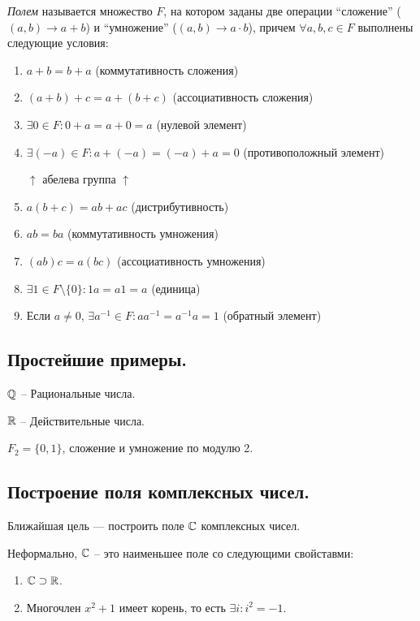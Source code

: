 \begin{definition}
    \textit{Полем} называется множество $F$, на котором заданы две операции ``сложение'' ($(a, b) \to a + b$) и ``умножение'' ($(a, b) \to a \cdot b$), причем $\forall a, b, c \in F$ выполнены следующие условия:

    \begin{enumerate}[nosep]
        \item $a + b = b + a$ (коммутативность сложения)
        \item $(a + b) + c = a + (b + c)$ (ассоциативность сложения)
        \item $\exists 0 \in F : 0 + a = a + 0 = a$ (нулевой элемент)
        \item $\exists (-a) \in F: a+(-a)=(-a)+a=0$ (противоположный элемент)

            $\uparrow$ абелева группа $\uparrow$
        \item $a(b+c) = ab + ac$ (дистрибутивность)
        \item $ab=ba$ (коммутативность умножения)
        \item $(ab)c=a(bc)$ (ассоциативность умножения)
        \item $\exists 1 \in F \setminus \{0\} : 1 a = a 1 = a$ (единица)
        \item Если $a \neq 0$, $\exists a^{-1} \in F : a a^{-1} = a^{-1} a = 1$ (обратный элемент)
    \end{enumerate}
\end{definition}


\subsection{Простейшие примеры.}

$\mathbb{Q}$ -- Рациональные числа.

$\mathbb{R}$ -- Действительные числа.

$F_2 = \{0, 1\}$, сложение и умножение по модулю 2.


\subsection{Построение поля комплексных чисел.}

Ближайшая цель --- построить поле $\mathbb{C}$ комплексных чисел.

Неформально, $\mathbb{C}$ -- это наименьшее поле со следующими свойставми:
\begin{enumerate}
\item $\mathbb{C} \supset \mathbb{R}$.
\item Многочлен $x^2 + 1$ имеет корень, то есть $\exists i : i^2 = -1$.
\end{enumerate}


